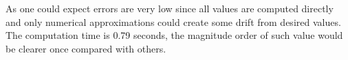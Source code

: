 As one could expect errors are very low since all values are computed directly and only numerical approximations could create some drift from desired values. The computation time is 0.79 seconds, the magnitude order of such value would be clearer once compared with others.
\begin{figure}[ht]
	\centering
	\hspace{1cm}
\end{figure}
